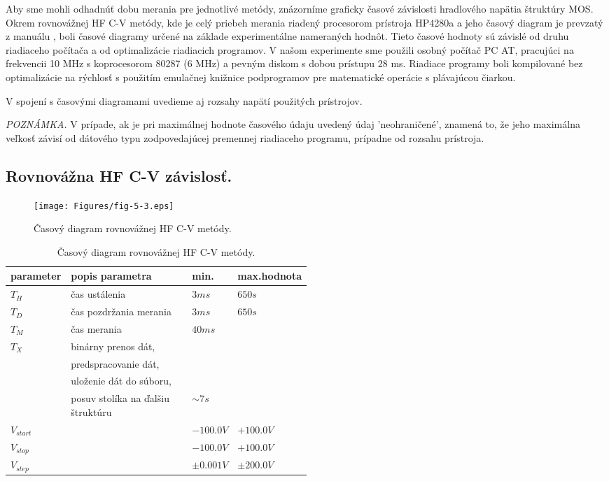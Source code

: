 Aby sme mohli odhadnúť dobu merania pre jednotlivé metódy, znázorníme
graficky časové závislosti hradlového napätia štruktúry MOS. Okrem
rovnovážnej HF C-V metódy, kde je celý priebeh merania riadený
procesorom prístroja HP4280a a jeho časový diagram je prevzatý z
manuálu \cite{5.7}, boli časové diagramy určené na základe
experimentálne nameraných hodnôt. Tieto časové hodnoty sú závislé od
druhu riadiaceho počítača a od optimalizácie riadiacich programov. V
našom experimente sme použili osobný počítač PC AT, pracujúci na
frekvencii 10 MHz s koprocesorom 80287 (6 MHz) a pevným diskom s dobou
prístupu 28 ms. Riadiace programy boli kompilované bez optimalizácie
na rýchlosť s použitím emulačnej knižnice podprogramov pre matematické
operácie s plávajúcou čiarkou.

V spojení s časovými diagramami uvedieme aj rozsahy napätí použitých
prístrojov.

\par\emph{POZNÁMKA.} V prípade, ak je pri maximálnej hodnote časového
údaju uvedený údaj 'neohraničené', znamená to, že jeho maximálna
veľkosť závisí od dátového typu zodpovedajúcej premennej riadiaceho
programu, prípadne od rozsahu prístroja.


\newpage
\subsection{Rovnovážna HF C-V závislosť.}\label{sec:5.4.1}

\begin{figure}[h!]\centering
\texttt{[image: Figures/fig-5-3.eps]}
\captionsetup{justification=raggedright, singlelinecheck=false}
\caption[Časový diagram rovnovážnej HF C-V metódy]{Časový diagram
  rovnovážnej HF C-V metódy.}
\label{fig:5.3}
\end{figure}

\begin{table}[h!]\centering
\begin{tabular}{ l p{0.5\linewidth} l l }
\hline
parameter   & popis parametra & min. & max.hodnota \\
\hline
$T_H$       & čas ustálenia \dotfill & $3 ms$ &  $650 s$\\
$T_D$       & čas pozdržania merania \dotfill & $3 ms$ & $650 s$ \\
$T_M$       & čas merania \dotfill & $40 ms$ \\
$T_X$       & binárny prenos dát,\\
            & predspracovanie dát,\\
            & uloženie dát do súboru,\\
            & posuv stolíka na ďalšiu štruktúru \dotfill & $\sim 7 s$ \\
$V_{start}$ & \dotfill & $-100.0 V$ & $+100.0 V$ \\
$V_{stop}$  & \dotfill & $-100.0 V$ & $+100.0 V$ \\
$V_{step}$  & \dotfill & $\pm 0.001 V$ & $\pm 200.0 V$ \\
\hline
\end{tabular}
\caption[Časový diagram rovnovážnej HF C-V metódy]{Časový diagram
  rovnovážnej HF C-V metódy.}
\label{tab:5.1}
\end{table}

